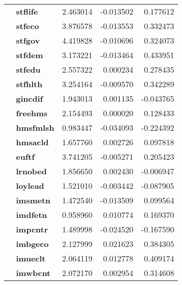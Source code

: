 \begin{table}[H]
\begin{tabular}{llrrr}
\textbf{} & \textbf{stflife} & 2.463014 & -0.013502 & 0.177612 \\
\textbf{} & \textbf{stfeco} & 3.876578 & -0.013553 & 0.332473 \\
\textbf{} & \textbf{stfgov} & 4.419828 & -0.010696 & 0.324073 \\
\textbf{} & \textbf{stfdem} & 3.173221 & -0.013464 & 0.433951 \\
\textbf{} & \textbf{stfedu} & 2.557322 & 0.000234 & 0.278435 \\
\textbf{} & \textbf{stfhlth} & 3.254164 & -0.009570 & 0.342289 \\
\textbf{} & \textbf{gincdif} & 1.943013 & 0.001135 & -0.043765 \\
\textbf{} & \textbf{freehms} & 2.154493 & 0.000020 & 0.128433 \\
\textbf{} & \textbf{hmsfmlsh} & 0.983447 & -0.034093 & -0.224392 \\
\textbf{} & \textbf{hmsacld} & 1.657760 & 0.002726 & 0.097818 \\
\textbf{} & \textbf{euftf} & 3.741205 & -0.005271 & 0.205423 \\
\textbf{} & \textbf{lrnobed} & 1.856650 & 0.002430 & -0.006947 \\
\textbf{} & \textbf{loylead} & 1.521010 & -0.003442 & -0.087905 \\
\textbf{} & \textbf{imsmetn} & 1.472540 & -0.013509 & 0.099564 \\
\textbf{} & \textbf{imdfetn} & 0.958960 & 0.010774 & 0.169370 \\
\textbf{} & \textbf{impcntr} & 1.489998 & -0.024520 & -0.167590 \\
\textbf{} & \textbf{imbgeco} & 2.127999 & 0.021623 & 0.384305 \\
\textbf{} & \textbf{imueclt} & 2.064119 & 0.012778 & 0.409174 \\
\textbf{} & \textbf{imwbcnt} & 2.072170 & 0.002954 & 0.314608 \\
\cline{1-5}
\bottomrule
\end{tabular}
\end{table}
